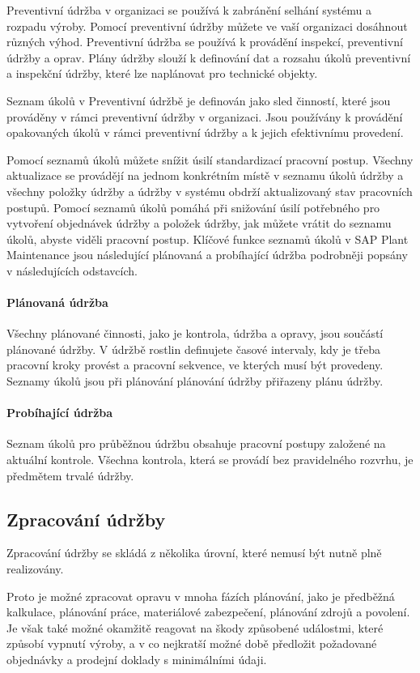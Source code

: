 \documentclass[thesis=M,czech]{FITthesis}[2012/06/26]
\begin{document}
Preventivní údržba v organizaci se používá k zabránění selhání systému a rozpadu výroby. Pomocí preventivní údržby můžete ve vaší organizaci dosáhnout různých výhod. Preventivní údržba se používá k provádění inspekcí, preventivní údržby a oprav. Plány údržby slouží k definování dat a rozsahu úkolů preventivní a inspekční údržby, které lze naplánovat pro technické objekty.

Seznam úkolů v Preventivní údržbě je definován jako sled činností, které jsou prováděny v rámci preventivní údržby v organizaci. Jsou používány k provádění opakovaných úkolů v rámci preventivní údržby a k jejich efektivnímu provedení.

Pomocí seznamů úkolů můžete snížit úsilí standardizací pracovní postup. Všechny aktualizace se provádějí na jednom konkrétním místě v seznamu úkolů údržby a všechny položky údržby a údržby v systému obdrží aktualizovaný stav pracovních postupů. Pomocí seznamů úkolů pomáhá při snižování úsilí potřebného pro vytvoření objednávek údržby a položek údržby, jak můžete vrátit do seznamu úkolů, abyste viděli pracovní postup.
Klíčové funkce seznamů úkolů v SAP Plant Maintenance jsou následující plánovaná a probíhající údržba podrobněji popsány v následujících odstavcích.

\paragraph{Plánovaná údržba}
Všechny plánované činnosti, jako je kontrola, údržba a opravy, jsou součástí plánované údržby. V údržbě rostlin definujete časové intervaly, kdy je třeba pracovní kroky provést a pracovní sekvence, ve kterých musí být provedeny. Seznamy úkolů jsou při plánování plánování údržby přiřazeny plánu údržby.

\paragraph{Probíhající údržba}
Seznam úkolů pro průběžnou údržbu obsahuje pracovní postupy založené na aktuální kontrole. Všechna kontrola, která se provádí bez pravidelného rozvrhu, je předmětem trvalé údržby.

\subsection{Zpracování údržby}
Zpracování údržby se skládá z několika úrovní, které nemusí být nutně plně realizovány.

Proto je možné zpracovat opravu v mnoha fázích plánování, jako je předběžná kalkulace, plánování práce, materiálové zabezpečení, plánování zdrojů a povolení. Je však také možné okamžitě reagovat na škody způsobené událostmi, které způsobí vypnutí výroby, a v co nejkratší možné době předložit požadované objednávky a prodejní doklady s minimálními údaji.
\end{document}
